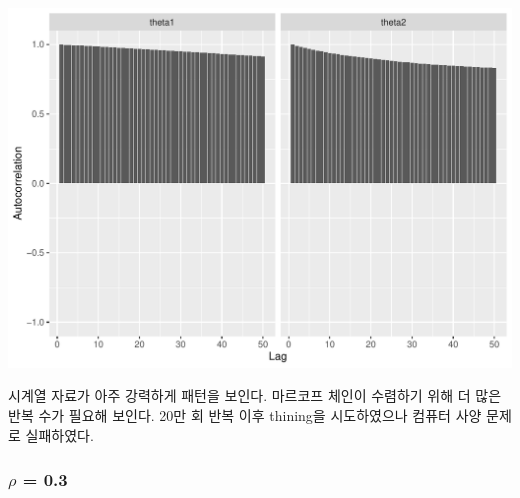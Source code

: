 \documentclass[
]{article}
\begin{document}
\begin{center}\includegraphics[width=0.8\linewidth]{Bayes_stat_hw3_files/figure-latex/unnamed-chunk-22-1} \end{center}

시계열 자료가 아주 강력하게 패턴을 보인다. 마르코프 체인이 수렴하기 위해
더 많은 반복 수가 필요해 보인다. 20만 회 반복 이후 thining을
시도하였으나 컴퓨터 사양 문제로 실패하였다.

\subsubsection{\texorpdfstring{\(\rho\) =
0.3}{\textbackslash rho = 0.3}}\label{rho-0.3-1}
\end{document}
